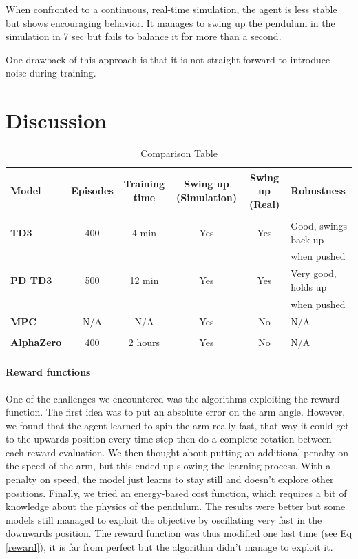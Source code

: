 \documentclass{LTHtwocol} %
\begin{document}
When confronted to a continuous, real-time simulation, the agent is less stable but shows encouraging behavior. It manages to swing up the pendulum in the simulation in 7 sec but fails to balance it for more than a second. 

One drawback of this approach is that it is not straight forward to introduce noise during training. 

\section{Discussion}
\begin{table}[]
\centering
\caption{Comparison Table}
\label{tab:comparison}
\begin{tabular}{lccccl}
\vspace{6pt}
\textbf{Model} & \textbf{Episodes} & \textbf{Training time} & \textbf{Swing up (Simulation)} & \textbf{Swing up (Real)} & \textbf{Robustness} \\ \hline \\
\textbf{TD3} & 400 & 4 min & Yes & Yes & Good, swings back up\\
\vspace{6pt}
& & & & &  when pushed \\
\textbf{PD TD3} & 500 & 12 min & Yes & Yes & Very good, holds up \\
\vspace{6pt}
& & & & & when pushed \\
\textbf{MPC} & N/A & N/A & Yes & No & N/A \\ \\
\vspace{6pt}
\textbf{AlphaZero} & 400 & 2 hours & Yes & No & N/A
\vspace{6pt}

\end{tabular}
\end{table}
\paragraph{Reward functions} One of the challenges we encountered was the algorithms exploiting the reward function. The first idea was to put an absolute error on the arm angle. However, we found that the agent learned to spin the arm really fast, that way it could get to the upwards position every time step then do a complete rotation between each reward evaluation. We then thought about putting an additional penalty on the speed of the arm, but this ended up slowing the learning process. With a penalty on speed, the model just learns to stay still and doesn't explore other positions. Finally, we tried an energy-based cost function, which requires a bit of knowledge about the physics of the pendulum. The results were better but some models still managed to exploit the objective by oscillating very fast in the downwards position. The reward function was thus modified one last time (see Eq \ref{reward}), it is far from perfect but the algorithm didn't manage to exploit it.
\end{document}
